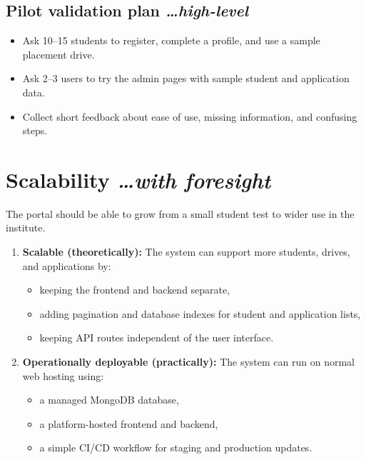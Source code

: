 \documentclass[11pt,a4paper]{article}
\newcommand{\BvrHint}[1]{{\normalfont\normalsize\itshape\hfill #1}}
\begin{document}
\subsection{Pilot validation plan \BvrHint{\ldots high-level}}
\begin{itemize}[leftmargin=0.7cm]
  \item Ask 10--15 students to register, complete a profile, and use a sample placement drive.
  \item Ask 2--3 users to try the admin pages with sample student and application data.
  \item Collect short feedback about ease of use, missing information, and confusing steps.
\end{itemize}

\section{Scalability \BvrHint{\ldots with foresight}}
The portal should be able to grow from a small student test to wider use in the institute.
\begin{enumerate}[leftmargin=0.7cm]
  \item \textbf{Scalable (theoretically):} The system can support more students, drives, and applications by:
  \begin{itemize}[leftmargin=0.7cm]
    \item keeping the frontend and backend separate,
    \item adding pagination and database indexes for student and application lists,
    \item keeping API routes independent of the user interface.
  \end{itemize}
  \item \textbf{Operationally deployable (practically):} The system can run on normal web hosting using:
  \begin{itemize}[leftmargin=0.7cm]
    \item a managed MongoDB database,
    \item a platform-hosted frontend and backend,
    \item a simple CI/CD workflow for staging and production updates.
  \end{itemize}
\end{enumerate}
\end{document}
